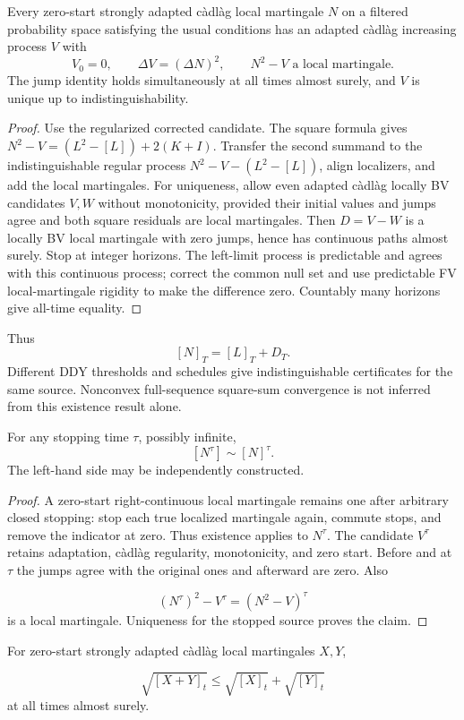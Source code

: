 \begin{theorem}
Every zero-start strongly adapted c\`adl\`ag local martingale $N$ on a
filtered probability space satisfying the usual conditions has an adapted
c\`adl\`ag increasing process $V$ with
\[
 V_0=0,\qquad\Delta V=(\Delta N)^2,\qquad N^2-V\text{ a local martingale}.
\]
The jump identity holds simultaneously at all times almost surely, and $V$
is unique up to indistinguishability.
\end{theorem}
\begin{proof}
Use the regularized corrected candidate. The square formula gives
$N^2-V=(L^2-[L])+2(K+I)$.
Transfer the second summand to the indistinguishable regular process
$N^2-V-(L^2-[L])$, align localizers, and add the local martingales.
For uniqueness, allow even adapted c\`adl\`ag locally BV candidates $V,W$
without monotonicity, provided their initial values and jumps agree and both
square residuals are local martingales. Then $D=V-W$ is a locally BV local
martingale with zero jumps, hence has continuous paths almost surely.
Stop at integer horizons. The left-limit process is predictable and agrees
with this continuous process; correct the common null set and use predictable
FV local-martingale rigidity to make the difference zero. Countably many
horizons give all-time equality.
\end{proof}
Thus
\[
 [N]_T=[L]_T+D_T.
\] Different DDY thresholds and schedules give
indistinguishable certificates for the same source. Nonconvex full-sequence
square-sum convergence is not inferred from this existence result alone.
\begin{lemma}
For any stopping time $\tau$, possibly infinite,
\[
 [N^\tau]\sim[N]^\tau.
\]
The left-hand side may be independently constructed.
\end{lemma}
\begin{proof}
A zero-start right-continuous local martingale remains one after arbitrary
closed stopping: stop each true localized martingale again, commute stops,
and remove the indicator at zero. Thus existence applies to $N^\tau$.
The candidate $V^\tau$ retains adaptation, c\`adl\`ag regularity,
monotonicity, and zero start. Before and at $\tau$ the jumps agree with the
original ones and afterward are zero. Also

\[
 (N^\tau)^2-V^\tau=(N^2-V)^\tau
\]
 is a local martingale.
Uniqueness for the stopped source proves the claim.
\end{proof}
\begin{lemma}
For zero-start strongly adapted c\`adl\`ag local martingales $X,Y$,

\[
 \sqrt{[X+Y]_t}\leq\sqrt{[X]_t}+\sqrt{[Y]_t}
\]
 at all times almost surely.
\end{lemma}
